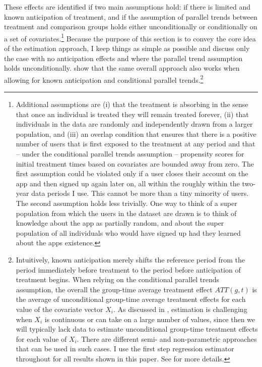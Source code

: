 These effects are identified if two main assumptions hold: if there is limited
and known anticipation of treatment, and if the assumption of parallel trends
between treatment and comparison groups holds either unconditionally or
conditionally on a set of covariates.\footnote{Additional assumptions are (i)
    that the treatment is absorbing in the sense that once an individual is
    treated they will remain treated forever, (ii) that individuals in the data
    are randomly and independently drawn from a larger population, and (iii) an
    overlap condition that ensures that there is a positive number of users
    that is first exposed to the treatment at any period and that -- under the
    conditional parallel trends assumption -- propensity scores for initial
    treatment times based on covariates are bounded away from zero. The first
    assumption could be violated only if a user closes their account on the app
    and then signed up again later on, all within the roughly within the
    two-year data periods I use. This cannot be more than a tiny minority of
    users. The second assumption holds less trivially. One way to think of a
    super population from which the users in the dataset are drawn is to think
of knowledge about the app as partially random, and about the super population
of all individuals who would have signed up had they learned about the apps
existence.} Because the purpose of this section is to convey the core idea of
the estimation approach, I keep things as simple as possible and discuss only
the case with no anticipation effects and where the parallel trend assumption
holds unconditionally. \citet{callaway2021difference} show that the same
overall approach also works when allowing for known anticipation and
conditional parallel trends.\footnote{Intuitively, known anticipation merely
    shifts the reference period from the period immediately before treatment to
    the period before anticipation of treatment begins. When relying on the
    conditional parallel trends assumption, the overall the group-time average
    treatment effect $ATT(g, t)$ is the average of unconditional group-time
    average treatment effects for each value of the covariate vector $X_i$. As
    discussed in \citet{roth2022trending}, estimation is challenging when $X_i$
    is continuous or can take on a large number of values, since then we will
    typically lack data to estimate unconditional group-time treatment effects
    for each value of $X_i$. There are different semi- and non-parametric
    approaches that can be used in such cases. I use the first step regression
estimator throughout for all results shown in this paper. See
\citet{callaway2021difference, roth2022trending} for more details.}

